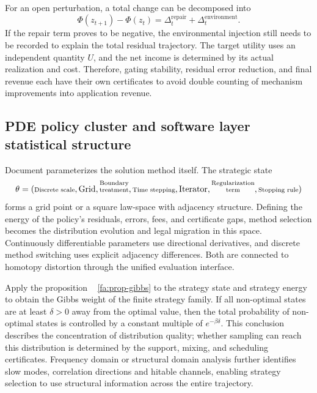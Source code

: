 \documentclass[11pt,a4paper]{article}
\theoremstyle{plain}
\theoremstyle{definition}
\theoremstyle{remark}
\begin{document}
\begin{CJK*}
For an open perturbation, a total change can be decomposed into \[
 \Phi(z_{t+1})-\Phi(z_t)
 =\Delta_t^{\mathrm{repair}}+\Delta_t^{\mathrm{environment}}.
\] If the repair term proves to be negative, the environmental injection still needs to be recorded to explain the total residual trajectory. The target utility uses an independent quantity $U$, and the net income is determined by its actual realization and cost. Therefore, gating stability, residual error reduction, and final revenue each have their own certificates to avoid double counting of mechanism improvements into application revenue.

\subsection { PDE policy cluster and software layer statistical structure }

Document \cite{S32} parameterizes the solution method itself. The strategic state \[
 \theta=(\text{\shortstack[c]{\scriptsize Discrete scale}},\text{Grid},\text{\shortstack[c]{\scriptsize Boundary\\[-1pt]\scriptsize treatment}},\text{\shortstack[c]{\scriptsize Time stepping}},
          \text{Iterator},\text{\shortstack[c]{\scriptsize Regularization\\[-1pt]\scriptsize term}},\text{\shortstack[c]{\scriptsize Stopping rule}})
\] forms a grid point or a square law-space with adjacency structure. Defining the energy of the policy's residuals, errors, fees, and certificate gaps, method selection becomes the distribution evolution and legal migration in this space. Continuously differentiable parameters use directional derivatives, and discrete method switching uses explicit adjacency differences. Both are connected to homotopy distortion through the unified evaluation interface.

Apply the proposition ~ \ref{fa:prop-gibbs} to the strategy state and strategy energy to obtain the Gibbs weight of the finite strategy family. If all non-optimal states are at least $\delta>0$ away from the optimal value, then the total probability of non-optimal states is controlled by a constant multiple of $e^{-\beta\delta}$. This conclusion describes the concentration of distribution quality; whether sampling can reach this distribution is determined by the support, mixing, and scheduling certificates. Frequency domain or structural domain analysis further identifies slow modes, correlation directions and hitable channels, enabling strategy selection to use structural information across the entire trajectory.


\end{CJK*}
\end{document}
